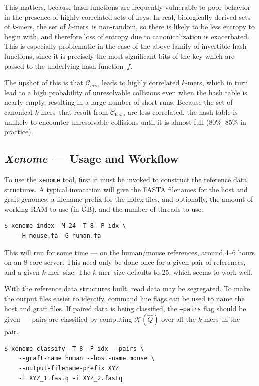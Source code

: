 \documentclass{bioinfo}
\newcommand{\Xenome}{\textit{Xenome}{}}
\newcommand{\kmer}{$k$-mer{}}
\newcommand{\kmers}{$k$-mers{}}
\begin{document}
This matters, because hash functions are frequently vulnerable to poor
behavior in the presence of highly correlated sets of keys. In real,
biologically derived sets
of \kmers, the set of \kmers\ is non-random, so there is likely to
be less entropy to begin with, and therefore loss of entropy due to
canonicalization is exacerbated.
This is especially problematic in the case of the above family of
invertible hash functions, since it is precisely the most-significant
bits of the key which are passed to the underlying hash function~$f$.

The upshot of this is that $\mathcal{C}_{\textit{min}}$ leads to
highly correlated \kmers, which in turn lead to a high probability
of unresolvable collisions even when the hash table is nearly empty,
resulting in a large number of short runs.
Because the set of canonical \kmers\ that result from $\mathcal{C}_{\textit{hash}}$ are less correlated,
the hash table is unlikely to encounter unresolvable collisions until
it is almost full (80\%--85\% in practice).


\subsection{\Xenome\  --- Usage and Workflow}
\label{sec:usage}

To use the \texttt{xenome} tool, first it must be invoked to construct
the reference data structures. A typical invocation will give the
FASTA filenames for the host and graft genomes, a filename prefix for the
index files, and optionally, the amount of working RAM to use (in GB),
and the number of threads to use:
\begin{verbatim}
$ xenome index -M 24 -T 8 -P idx \
    -H mouse.fa -G human.fa
\end{verbatim}

This will run for some time --- on the human/mouse references, around
4--6 hours on an 8-core server. This need only be done once for a given
pair of references, and a given \kmer\ size. The \kmer\ size defaults to 25,
which seems to work well.

With the reference data structures built, read data may be segregated.
To make the output files easier to identify, command line flags can be
used to name the host and graft files. If paired data is being classified,
the \texttt{--pairs} flag should be given --- pairs are classified by computing
$\mathcal{K}(\hat{Q})$ over all the \kmers\ in the pair.

\begin{verbatim}
$ xenome classify -T 8 -P idx --pairs \
    --graft-name human --host-name mouse \
    --output-filename-prefix XYZ
    -i XYZ_1.fastq -i XYZ_2.fastq
\end{verbatim}
\end{document}
